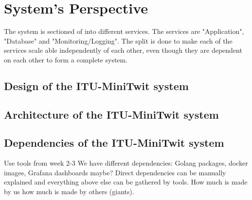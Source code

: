 \section{System's Perspective}







The system is sectioned of into different services. The services are "Application", "Database" and "Monitoring/Logging". The split is done to make each of the services scale able independently of each other, even though they are dependent on each other to form a complete system.



\subsection{Design of the ITU-MiniTwit system}

\subsection{Architecture of the ITU-MiniTwit system}

\subsection{Dependencies of the ITU-MiniTwit system}
Use tools from week 2-3
We have different dependencies: Golang packages, docker images, Grafana dashboards maybe?
Direct dependencies can be manually explained and everything above else can be gathered by tools.
How much is made by us how much is made by others (giants).



